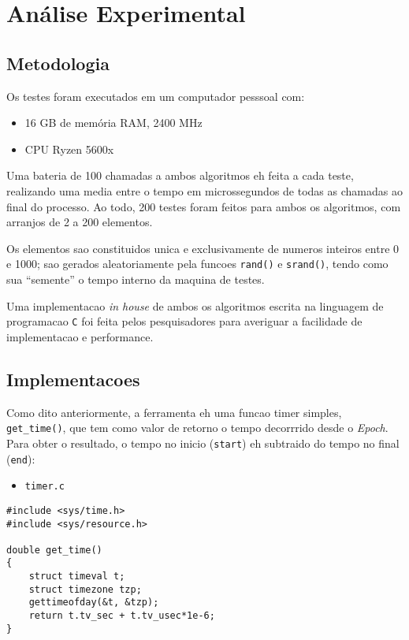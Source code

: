 \documentclass{article}
\begin{document}
\section{Análise Experimental}

\subsection{Metodologia}

Os testes foram executados em um computador pesssoal com:
\begin{itemize}
  \item{16 GB de memória RAM, 2400 MHz}
  \item{CPU Ryzen 5600x}
\end{itemize}
Uma bateria de 100 chamadas a ambos algoritmos eh feita a cada teste, realizando uma media entre o tempo em microssegundos de todas as chamadas ao final do processo. Ao todo, 200 testes foram feitos para ambos os algoritmos, com arranjos de 2 a 200 elementos.

Os elementos sao constituidos unica e exclusivamente de numeros inteiros entre 0 e 1000; sao gerados aleatoriamente pela funcoes \texttt{rand()} e \texttt{srand()}, tendo como sua ``semente'' o tempo interno da maquina de testes.

Uma implementacao \textit{in house} de ambos os algoritmos escrita na linguagem de programacao \texttt{C} foi feita pelos pesquisadores para averiguar a facilidade de implementacao e performance.

\subsection{Implementacoes}

Como dito anteriormente, a ferramenta eh uma funcao timer simples, \texttt{get\_time()}, que tem como valor de retorno o tempo decorrrido desde o \textit{Epoch}. Para obter o resultado, o tempo no inicio (\texttt{start}) eh subtraido do tempo no final (\texttt{end}):

\begin{itemize}
  \item{\texttt{timer.c}}
\end{itemize}
\begin{verbatim}
#include <sys/time.h>
#include <sys/resource.h>

double get_time()
{
    struct timeval t;
    struct timezone tzp;
    gettimeofday(&t, &tzp);
    return t.tv_sec + t.tv_usec*1e-6;
}
\end{verbatim}
\end{document}
